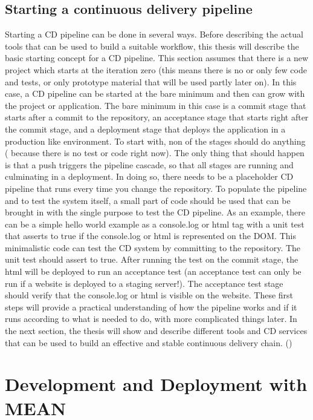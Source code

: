 \subsection{Starting a continuous delivery pipeline}
Starting a CD pipeline can be done in several ways. Before describing the actual tools that can be used to build a suitable workflow, this thesis will describe
the basic starting concept for a CD pipeline.
This section assumes that there is a new project which starts at the iteration zero (this means there is no or only few code and tests, or
only prototype material that will be used partly later on). In this case, a CD pipeline can be started at the bare minimum and then can grow with the project
or application. The bare minimum in this case is a commit stage that starts after a commit to the repository, an acceptance stage that starts right after the
commit stage, and a deployment stage that deploys the application in a production like environment. To start with, non of the stages should do anything (
because there is no test or code right now). The only thing that should happen is that a push triggers the pipeline cascade, so that all stages are running
and culminating in a deployment. In doing so, there needs to be a placeholder CD pipeline that runs every time you change the repository. To populate the pipeline
and to test the system itself, a small part of code should be used that can be brought in with the single purpose to test the CD pipeline. As an example, there
can be a simple hello world example as a console.log or html tag with a unit test that asserts to true if the console.log or html is represented on the DOM.
This minimalistic code can test the CD system by committing to the repository. The unit test should assert to true. After running the test on the commit stage, the html
will be deployed to run an acceptance test (an acceptance test can only be run if a website is deployed to a staging server!). The acceptance test stage should
verify that the console.log or html is visible on the website. These first steps will provide a practical understanding of how the pipeline works and
if it runs according to what is needed to do, with more complicated things later. In the next section, the thesis will show and describe different tools
and CD services that can be used to build an effective and stable continuous delivery chain. (\cite{humble2010continuous})


\section{Development and Deployment with MEAN}
\label{section:Development and Deployment with MEAN}

